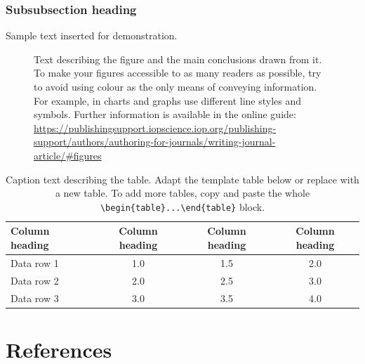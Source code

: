 \documentclass{iopjournal}
\begin{document}
\subsubsection{Subsubsection heading}
Sample text inserted for demonstration.

\begin{figure}
 \centering
        \fbox{\rule{0pt}{1.2in}\rule{0.5\textwidth}{0pt}}
 \caption{Text describing the figure and the main conclusions drawn from it. To make your figures accessible to as many readers as possible, try to avoid using colour as the only means of conveying information. For example, in charts and graphs use different line styles and symbols. Further information is available in the online guide: \href{https://publishingsupport.iopscience.iop.org/publishing-support/authors/authoring-for-journals/writing-journal-article/\#figures}{https://publishingsupport.iopscience.iop.org/publishing-support/authors/authoring-for-journals/writing-journal-article/\#figures}}
\label{fig1}
\end{figure}


\begin{table}
\caption{Caption text describing the table. Adapt the template table below or replace with a new table. To add more tables, copy and paste the whole {\tt \textbackslash begin\{table\}...\textbackslash end\{table\}} block.}
\centering
\begin{tabular}{l c c c}
\hline
Column heading & Column heading & Column heading & Column heading \\
\hline
Data row 1 & 1.0 & 1.5 & 2.0 \\
Data row 2 & 2.0 & 2.5 & 3.0 \\
Data row 3 & 3.0 & 3.5 & 4.0 \\
\hline
\end{tabular}
\label{tab1}
\end{table}

%
%







\section*{References}
\end{document}
